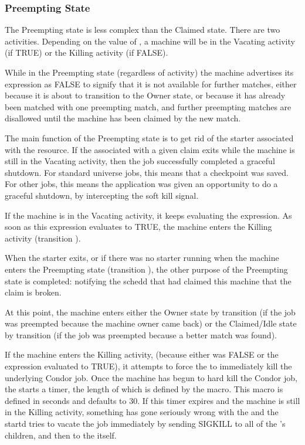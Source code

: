 \subsubsection{\label{sec:Preempting-State}Preempting State}

The Preempting state is less complex than the Claimed state.
There are two activities.
Depending on the value of , a machine will
be in the
Vacating activity (if TRUE) or the Killing activity (if FALSE).  

While in the Preempting state (regardless of activity) the machine
advertises its  expression as FALSE to signify that
it is not available for further matches, either because it is about to
transition
to the Owner state, or because it has already been matched with
one preempting match, and further preempting matches are disallowed
until the machine has been claimed by the new match.

The main function of the Preempting state is to get rid of the starter
associated with the resource.  If the  associated with
a given claim exits while the machine is still in the Vacating
activity, then the job successfully completed a graceful shutdown.
For standard universe jobs, this means that a checkpoint was saved.
For other jobs, this means the application was given an opportunity to
do a graceful shutdown, by intercepting the soft kill signal.

If the machine is in the Vacating activity, it keeps evaluating the 
 expression.
As soon as this expression evaluates to TRUE,
the machine enters the Killing activity (transition ).

When the starter exits, or if there was no starter running when the
machine enters the Preempting state (transition ),
the other purpose of the Preempting state is completed:
notifying the schedd that had claimed this machine that the claim is
broken.

At this point, the machine enters either the Owner state by
transition  (if the job was preempted because the machine
owner came back) or the Claimed/Idle state by transition 
(if the job was preempted because a better match was found).

If the machine enters the Killing activity, (because either
 was FALSE or the  expression evaluated
to TRUE), it attempts to force the  to immediately
kill the underlying Condor job.
Once the machine has begun to hard kill the Condor job, the
 starts a timer, the length of which is defined by the
 \label{param:KillingTimeout} macro.
This macro is defined in seconds and defaults to 30.
If this timer expires and the machine is still in
the Killing activity, something has gone seriously wrong with the
 and the startd tries to vacate the job immediately by
sending SIGKILL to all of the 's children, and then to
the  itself.

